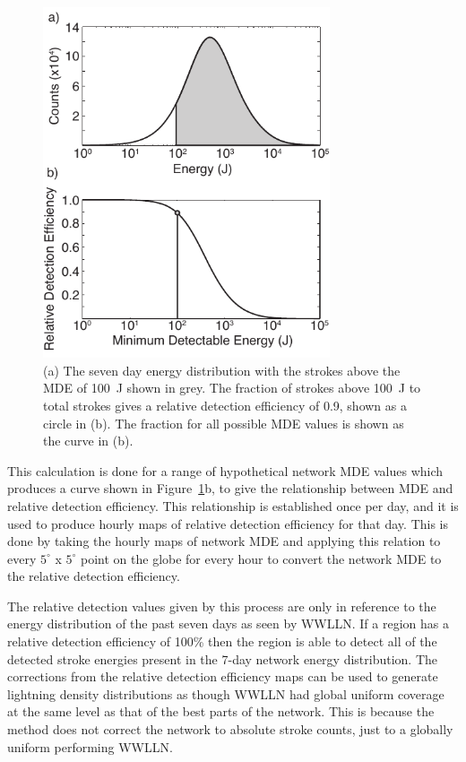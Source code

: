 \begin{figure}[ht!]
   \centering
\noindent\includegraphics[width=20pc]{efficiency/Figures/2012RS005049-f5.pdf}
   \caption{(a) The seven day energy distribution with the strokes above the MDE of 100~J shown in grey.
The fraction of strokes above 100~J to total strokes gives a relative detection efficiency of 0.9, shown as a circle in (b).
The fraction for all possible MDE values is shown as the curve in (b).}
   \label{efficiency:fig:Curve}
\end{figure}

This calculation is done for a range of hypothetical network MDE values which produces a curve shown in Figure~\ref{efficiency:fig:Curve}b, to give the relationship between MDE and relative detection efficiency.
This relationship is established once per day, and it is used to produce hourly maps of relative detection efficiency for that day.
This is done by taking the hourly maps of network MDE and applying this relation to every $5^\circ$ x $5^\circ$ point on the globe for every hour to convert the network MDE to the relative detection efficiency.

The relative detection values given by this process are only in reference to the energy distribution of the past seven days as seen by WWLLN.
If a region has a relative detection efficiency of 100\% then the region is able to detect all of the detected stroke energies present in the 7-day network energy distribution.
The corrections from the relative detection efficiency maps can be used to generate lightning density distributions as though WWLLN had global uniform coverage at the same level as that of the best parts of the network.
This is because the method does not correct the network to absolute stroke counts, just to a globally uniform performing WWLLN.

